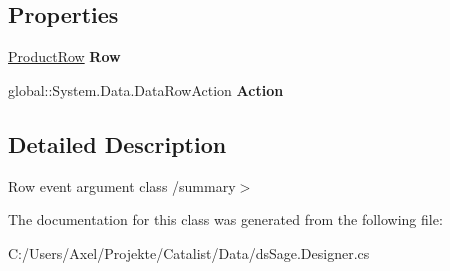 \subsection*{Properties}
\begin{DoxyCompactItemize}
\item 
\hyperlink{class_products_1_1_data_1_1ds_sage_1_1_product_row}{Product\+Row} {\bfseries Row}\hypertarget{class_products_1_1_data_1_1ds_sage_1_1_product_row_change_event_a2f3d163e0ae15283b0689ec3d1e3ba03}{}\label{class_products_1_1_data_1_1ds_sage_1_1_product_row_change_event_a2f3d163e0ae15283b0689ec3d1e3ba03}

\item 
global\+::\+System.\+Data.\+Data\+Row\+Action {\bfseries Action}\hypertarget{class_products_1_1_data_1_1ds_sage_1_1_product_row_change_event_a885de3dd7375eacb8aa555c09edfe4e2}{}\label{class_products_1_1_data_1_1ds_sage_1_1_product_row_change_event_a885de3dd7375eacb8aa555c09edfe4e2}

\end{DoxyCompactItemize}


\subsection{Detailed Description}
Row event argument class /summary$>$ 

The documentation for this class was generated from the following file\+:\begin{DoxyCompactItemize}
\item 
C\+:/\+Users/\+Axel/\+Projekte/\+Catalist/\+Data/ds\+Sage.\+Designer.\+cs\end{DoxyCompactItemize}
